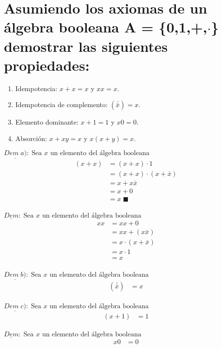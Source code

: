 \chapter*{Asumiendo los axiomas de un álgebra booleana  A = \{{0,1},+,$\cdot$\} demostrar las siguientes propiedades:}
\begin{enumerate}[label=\alph*)]
	\item Idempotencia: $x+x = x $ y $ xx = x$.
	\item Idempotencia de complemento:  $(\bar{\bar{x}})= x$.
	\item Elemento dominante: $x+1 = 1$ y $x0 = 0$.
	\item Absorción: $x+xy = x$ y $x(x+y) = x$.
\end{enumerate}
\begin{multicols}{2}
	\noindent
	$\underline{Dem \;a)}:\; \text{Sea $x$ un elemento del álgebra booleana}$
	\begin{align*}
		(x+x) & =(x+x)\cdot 1           \\
		      & =(x+x)\cdot (x+\bar{x}) \\
		      & =x + x\bar{x}           \\
		      & =x + 0                  \\
		      & =x\; \blacksquare       \\
	\end{align*}

	\columnbreak

	\noindent
	$\underline{Dem}:\; \text{Sea $x$ un elemento del álgebra booleana}$
	\begin{align*}
		xx & =xx+0              \\
		   & =xx+(x\bar{x})     \\
		   & =x\cdot(x+\bar{x}) \\
		   & =x\cdot 1          \\
		   & =x                 \\
	\end{align*}
\end{multicols}
\begin{multicols}{2}
	\noindent
	$\underline{Dem \;b)}:\; \text{Sea $x$ un elemento del álgebra booleana}$
	\begin{align*}
		(\bar{\bar{x}}) & = x \\
	\end{align*}
\end{multicols}

\begin{multicols}{2}
	\noindent
	$\underline{Dem \;c)}:\; \text{Sea $x$ un elemento del álgebra booleana}$
	\begin{align*}
		(x+1) & = 1 \\
	\end{align*}

	\columnbreak

	\noindent
	$\underline{Dem}:\; \text{Sea $x$ un elemento del álgebra booleana}$
	\begin{align*}
		x0 & = 0 \\
	\end{align*}
\end{multicols}

